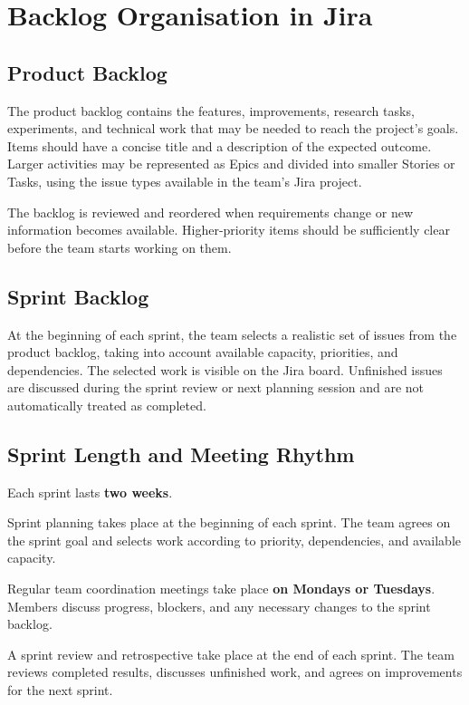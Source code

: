 \documentclass[12pt,a4paper]{article}
\begin{document}
\section{Backlog Organisation in Jira}

\subsection{Product Backlog}

The product backlog contains the features, improvements, research tasks,
experiments, and technical work that may be needed to reach the project's
goals. Items should have a concise title and a description of the expected
outcome. Larger activities may be represented as Epics and divided into
smaller Stories or Tasks, using the issue types available in the team's
Jira project.

The backlog is reviewed and reordered when requirements change or new
information becomes available. Higher-priority items should be
sufficiently clear before the team starts working on them.

\subsection{Sprint Backlog}

At the beginning of each sprint, the team selects a realistic set of
issues from the product backlog, taking into account available capacity,
priorities, and dependencies. The selected work is visible on the Jira
board. Unfinished issues are discussed during the sprint review or next
planning session and are not automatically treated as completed.

\subsection{Sprint Length and Meeting Rhythm}

Each sprint lasts \textbf{two weeks}.

Sprint planning takes place at the beginning of each sprint.
The team agrees on the sprint goal and selects work according
to priority, dependencies, and available capacity.

Regular team coordination meetings take place
\textbf{on Mondays or Tuesdays}. Members discuss progress,
blockers, and any necessary changes to the sprint backlog.

A sprint review and retrospective take place at the end of each
sprint. The team reviews completed results, discusses unfinished
work, and agrees on improvements for the next sprint.
\end{document}
